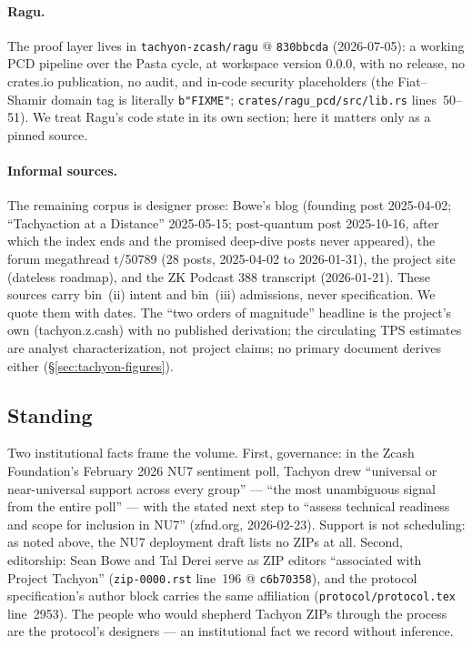 \documentclass[11pt,a4paper]{article}
\theoremstyle{definition}
\begin{document}
\paragraph{Ragu.} The proof layer lives in \texttt{tachyon-zcash/ragu}
@ \texttt{830bbcda} (2026-07-05): a working PCD pipeline over the Pasta cycle,
at workspace version 0.0.0, with no release, no crates.io publication, no
audit, and in-code security placeholders (the Fiat--Shamir domain tag is
literally \texttt{b"FIXME"}; \texttt{crates/ragu\_pcd/src/lib.rs}
lines~50--51).
We treat Ragu's code state in its own section; here it matters only as a
pinned source.

\paragraph{Informal sources.} The remaining corpus is designer prose: Bowe's
blog (founding post 2025-04-02; ``Tachyaction at a Distance'' 2025-05-15;
post-quantum post 2025-10-16, after which the index ends and the promised
deep-dive posts never appeared), the forum megathread t/50789 (28 posts,
2025-04-02 to 2026-01-31), the project site (dateless roadmap), and the ZK
Podcast 388 transcript (2026-01-21). These sources carry bin~(ii) intent and
bin~(iii) admissions, never specification. We quote them with dates. The
``two orders of magnitude'' headline is the project's own (tachyon.z.cash)
with no published derivation; the circulating TPS estimates are analyst
characterization, not project claims; no primary document derives either
(\S\ref{sec:tachyon-figures}).

\subsection{Standing}\label{sec:tachyon-standing}

Two institutional facts frame the volume. First, governance: in the Zcash
Foundation's February 2026 NU7 sentiment poll, Tachyon drew ``universal or
near-universal support across every group'' --- ``the most unambiguous signal
from the entire poll'' --- with the stated next step to ``assess technical
readiness and scope for inclusion in NU7'' (zfnd.org, 2026-02-23). Support is
not scheduling: as noted above, the NU7 deployment draft lists no ZIPs at all.
Second, editorship: Sean Bowe and Tal Derei serve as ZIP editors ``associated
with Project Tachyon'' (\texttt{zip-0000.rst} line~196 @ \texttt{c6b70358}),
and the protocol specification's author block carries the same affiliation
(\texttt{protocol/protocol.tex} line~2953). The people who would shepherd
Tachyon ZIPs through the process are the protocol's designers --- an
institutional fact we record without inference.
\end{document}
